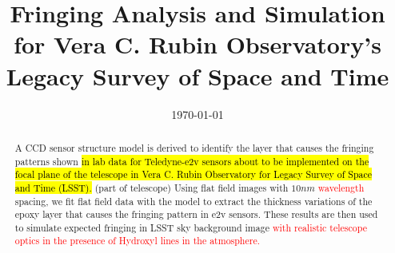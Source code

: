 \documentclass[twocolumn]{aastex63} %
\date{\today}
\begin{document}
\begin{CJK*}{UTF8}{gbsn}
\title{Fringing Analysis and Simulation for Vera C. Rubin Observatory's Legacy Survey of Space and Time} 



\begin{abstract}
A CCD sensor structure model is derived to identify the layer that causes the fringing patterns shown \hl {in lab data for Teledyne-e2v sensors about to be implemented on the focal plane of the telescope in  Vera C. Rubin Observatory for Legacy Survey of Space and Time (LSST).} (part of telescope) Using flat field images with $10 nm$ \textcolor{red}{wavelength} spacing, we fit flat field data with the model to extract the thickness variations of the epoxy layer that causes the fringing pattern in e2v sensors. These results are then used to simulate expected fringing in LSST sky background image \textcolor{red} {with realistic telescope optics in the presence of Hydroxyl lines in the atmosphere.}
\end{abstract}



\end{CJK*}
\end{document}
